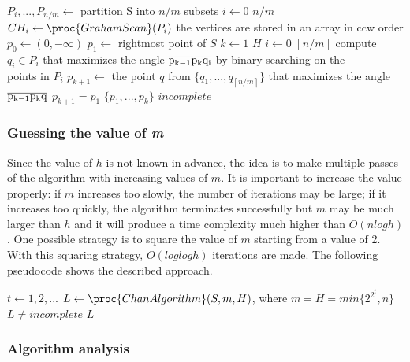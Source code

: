 \documentclass{article}
\begin{document}
\begin{codebox}
\li $P_i , ... , P_{n/m} \gets$ partition S into $n/m$ subsets
\li \For $i \gets 0$ \To $n/m$
    \Do
\li $CH_i \gets \proc{GrahamScan}(P_i)$ \Comment the vertices are stored in an array in ccw order
    \End
\li $p_0 \gets (0, -\infty)$
\li $p_1 \gets$ rightmost point of $S$
\li \For $k \gets 1$ \To $H$
    \Do
\li     \For $i \gets 0$ \To $\left\lceil n / m \right\rceil$
        \Do
\li         compute $q_i \in P_i$ that maximizes the angle $\overline{\rm p_{k-1}p_{k}q_i}$ by binary searching on the\\
        \>\>points in $P_i$
        \End
\li     $p_{k+1} \gets $ the point $q$ from $\{q_{1}, ..., q_{\left\lceil n / m \right\rceil}\}$ that maximizes the angle $\overline{\rm p_{k-1}p_{k}q}$
\li     \If $p_{k+1} = p_1$
        \Then
\li          \Return $\{p_1, ..., p_k\}$
        \End
    \End
\li \Return $incomplete$
\end{codebox}

\subsubsection*{Guessing the value of \textit{m}}

Since the value of $h$ is not known in advance, the idea is to make multiple passes of the algorithm with increasing values of $m$. It is important to increase the value properly: if $m$ increases too slowly, the number of iterations may be large; if it increases too quickly, the algorithm terminates successfully but $m$ may be much larger than $h$ and it will produce a time complexity much higher than $O(nlogh)$. One possible strategy is to square the value of $m$ starting from a value of 2. With this squaring strategy, $O(loglogh)$ iterations are made. The following pseudocode shows the described approach. 

\begin{codebox}
\li \For $t \gets 1, 2, ...$
    \Do
\li     $L \gets \proc{ChanAlgorithm}(S, m, H)$, where $m = H = min\{2^{2^t}, n\}$
\li     \If $L \neq incomplete$
        \Then
\li         \Return $L$
        \End
    \End
\end{codebox}

\subsubsection*{Algorithm analysis}
\end{document}
